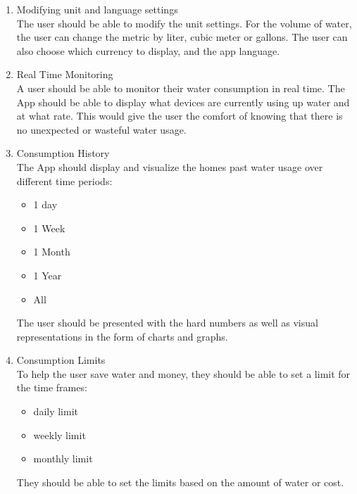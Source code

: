 \documentclass[10pt]{article}
\begin{document}
\begin{multicols}{2}
\begin{enumerate}
  \item {Modifying unit and language settings} \\
  The user should be able to modify the unit settings. For the volume of water, the user can change the metric by liter, cubic meter or gallons. The user can also choose which currency to display, and the app language.
  \item {Real Time Monitoring} \\
  A user should be able to monitor their water consumption in real time. The App should be able to display what devices are currently using up water and at what rate. This would give the user the comfort of knowing that there is no unexpected or wasteful water usage.
  \item {Consumption History} \\
  The App should display and visualize the homes past water usage over different time periods:

  \begin{itemize}
    \item 1 day
  
    \item 1 Week
  
    \item 1 Month
  
    \item 1 Year
  
    \item All
  
  \end{itemize}

  The user should be presented with the hard numbers as well as visual representations in the form of charts and graphs.

  \item {Consumption Limits}\\
  To help the user save water and money, they should be able to set a limit for the time frames:

  \begin{itemize}
    \item daily limit
  
    \item weekly limit
  
    \item monthly limit
  
  \end{itemize}
  
  They should be able to set the limits based on the amount of water or cost.
  

\end{enumerate}
\end{multicols}
\end{document}
